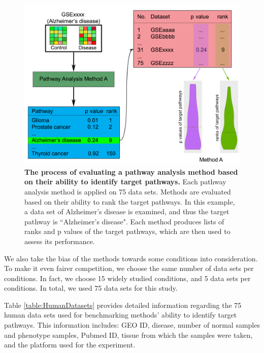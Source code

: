 \documentclass[Minh_PhD_thesis.tex]{subfiles}
\begin{document}
\begin{figure}
\includegraphics[width=0.8\linewidth]{../Figures/Fig1}
\caption{\textbf{The process of evaluating a pathway analysis method based on their ability to identify target pathways.} Each pathway analysis method is applied on 75 data sets. Methods are evaluated based on their ability to rank the target pathways. In this example, a data set of Alzheimer's disease is examined, and thus the target pathway is ``Alzheimer's disease". Each method produces lists of ranks and p values of the target pathways, which are then used to assess its performance.}
\label{workflow}
\end{figure}

We also take the bias of the methods towards some conditions into consideration. To make it even fairer competition, we choose the same number of data sets per conditions. In fact, we choose 15 widely studied conditions, and 5 data sets per conditions. In total, we used 75 data sets for this study.

Table \ref{table:HumanDatasets} provides detailed information regarding the 75 human data sets used for benchmarking methods' ability to identify target pathways. This information includes: GEO ID, disease, number of normal samples and phenotype samples,  Pubmed ID, tissue from which the samples were taken, and the platform used for the experiment.
\end{document}
